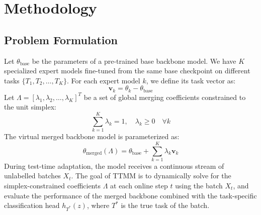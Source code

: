 \documentclass{article}
\theoremstyle{plain}
\theoremstyle{definition}
\theoremstyle{remark}
\begin{document}
\section{Methodology}
\label{submission-methodology}

\subsection{Problem Formulation}
Let $\theta_{\text{base}}$ be the parameters of a pre-trained base backbone model. We have $K$ specialized expert models fine-tuned from the same base checkpoint on different tasks $\{T_1, T_2, \dots, T_K\}$. For each expert model $k$, we define its task vector as:
\begin{equation}
    \mathbf{v}_k = \theta_k - \theta_{\text{base}}
\end{equation}
Let $\Lambda = [\lambda_1, \lambda_2, \dots, \lambda_K]^T$ be a set of global merging coefficients constrained to the unit simplex:
\begin{equation}
    \sum_{k=1}^K \lambda_k = 1, \quad \lambda_k \geq 0 \quad \forall k
\end{equation}
The virtual merged backbone model is parameterized as:
\begin{equation}
    \theta_{\text{merged}}(\Lambda) = \theta_{\text{base}} + \sum_{k=1}^K \lambda_k \mathbf{v}_k
\end{equation}
During test-time adaptation, the model receives a continuous stream of unlabelled batches $X_t$. The goal of TTMM is to dynamically solve for the simplex-constrained coefficients $\Lambda$ at each online step $t$ using the batch $X_t$, and evaluate the performance of the merged backbone combined with the task-specific classification head $h_{T^*}(z)$, where $T^*$ is the true task of the batch.
\end{document}
